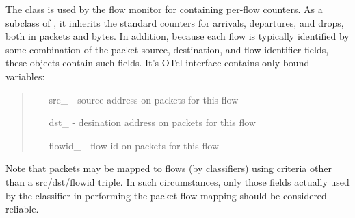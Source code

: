The class  is used by the flow monitor
for containing per-flow counters.
As a subclass of , it inherits the standard
counters for arrivals, departures, and drops, both in packets and
bytes.
In addition, because each flow is typically identified by
some combination of the packet source, destination, and flow
identifier fields, these objects contain such fields.
It's OTcl interface contains only bound variables:
\begin{quote}
\begin{itemize}
        \item[src\_] - source address on packets for this flow
        \item[dst\_] - desination address on packets for this flow
        \item[flowid\_] - flow id on packets for this flow
\end{itemize}
\end{quote}

Note that packets may be mapped to flows (by classifiers) using
criteria other than a src/dst/flowid triple.
In such circumstances, only those fields actually used by
the classifier in performing the packet-flow mapping should be
considered reliable.

\endinput
